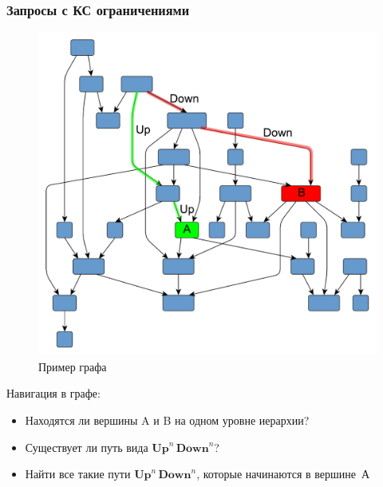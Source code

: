 \documentclass[xcolor=table,english]{beamer}
\begin{document}
\begin{frame}[fragile] \frametitle{Запросы с КС ограничениями}
    \begin{minipage}[m]{0.45\linewidth}
        \begin{figure}
            \centering
            \includegraphics[width=\textwidth]{pictures/hierarchical.pdf}
            \caption{Пример графа}
        \end{figure}
    \end{minipage}\hfill
    \begin{minipage}[m]{0.5\linewidth}
        Навигация в графе:
        \begin{itemize}
            \item Находятся ли вершины A и B на одном уровне иерархии?
            \item Существует ли путь вида $\textbf{Up}^n \, \textbf{Down}^n$?
            \item Найти все такие пути $\textbf{Up}^n \, \textbf{Down}^n$, которые начинаются в вершине~А
        \end{itemize}
  \end{minipage}
\end{frame}
\end{document}
